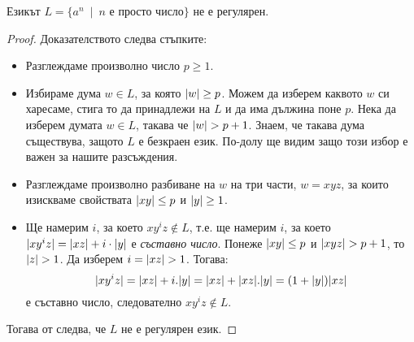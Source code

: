 \begin{example}
  Езикът $L = \{a^n\ \mid\ n\mbox{ е просто число}\}$ не е регулярен.
\end{example}
\begin{proof}
  Доказателството следва стъпките:
  \begin{itemize}
  \item 
    Разглеждаме произволно число $p \geq 1$.
  \item
    Избираме дума $w \in L$, за която $\lvert{w}\rvert \geq p$. Можем да изберем каквото $w$ 
    си харесаме, стига то да принадлежи на $L$ и да има дължина поне $p$.
    Нека да изберем думата $w \in L$, такава че $\lvert{w}\rvert > p+1$.
    Знаем, че такава дума съществува, защото $L$ е безкраен език. По-долу ще видим защо този избор е важен за нашите разсъждения.
  \item
    Разглеждаме произволно разбиване на $w$ на три части, $w = xyz$,
    за които изискваме свойствата $\lvert{xy}\rvert \leq p$ и $\lvert{y}\rvert \geq 1$.
  \item
    Ще намерим $i$, за което $xy^iz \not\in L$,
    т.е. ще намерим $i$, за което 
    $\lvert{xy^iz}\rvert = \lvert{xz}\rvert + i\cdot\lvert{y}\rvert$ е {\em съставно число}.
    Понеже $\lvert{xy}\rvert \leq p$ и $\lvert{xyz}\rvert > p+1$, то $\lvert{z}\rvert > 1$.
    Да изберем $i = \lvert{xz}\rvert > 1$. Тогава:
    \[\lvert{xy^iz}\rvert = \lvert{xz}\rvert + i.\lvert{y}\rvert = \lvert{xz}\rvert + \lvert{xz}\rvert.\lvert{y}\rvert = (1 + \lvert{y}\rvert)\lvert{xz}\rvert\] е съставно число, следователно 
    $xy^iz \not\in L$.
  \end{itemize}
  Тогава от  следва, че $L$ не е регулярен език.
\end{proof}

